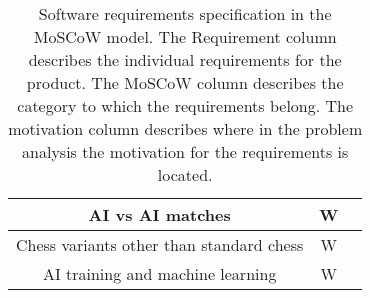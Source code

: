 \begin{table}[H]
{\begin{tabular}{ccc}
            \\ \midrule
            AI vs AI matches                         & W                        & {\ul~\ref{subsec:ai-engines}}
            \\ \midrule
            Chess variants other than standard chess & W                        & {\ul~\ref{sec:chess}}
            \\ \midrule
            AI training and machine learning         & W                        & {\ul~\ref{subsec:ai-engines}}
            \\ \bottomrule
        \end{tabular}%
    }
    \caption{Software requirements specification in the MoSCoW model.
    The Requirement column describes the individual requirements for the product.
    The MoSCoW column describes the category to which the requirements belong.
    The motivation column describes where in the problem analysis the motivation for the requirements is located.
    }\label{tab:srs}
\end{table}
